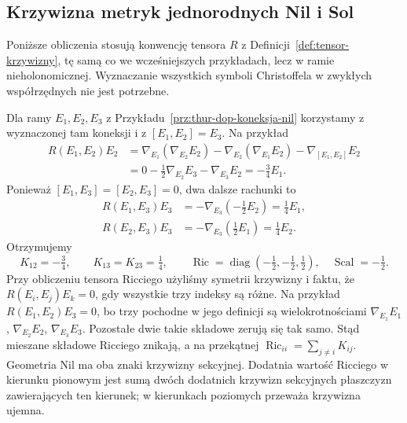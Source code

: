 \subsection*{Krzywizna metryk jednorodnych Nil i Sol}
\label{sec:thur-dop-krzywizna-nil-sol}
Poniższe obliczenia stosują konwencję tensora $R$ z
Definicji~\ref{def:tensor-krzywizny}, tę samą co we wcześniejszych
przykładach, lecz w ramie nieholonomicznej. Wyznaczanie
wszystkich symboli Christoffela w zwykłych współrzędnych
nie jest potrzebne.

\begin{przyklad}
\label{prz:thur-dop-krzywizna-nil}
Dla ramy $E_1,E_2,E_3$ z Przykładu~\ref{prz:thur-dop-koneksja-nil}
korzystamy z wyznaczonej tam koneksji i z $[E_1,E_2]=E_3$.
Na przykład
\[
\begin{aligned}
 R(E_1,E_2)E_2
 &=\nabla_{E_1}(\nabla_{E_2}E_2)
   -\nabla_{E_2}(\nabla_{E_1}E_2)
   -\nabla_{[E_1,E_2]}E_2\\
 &=0-\tfrac12\nabla_{E_2}E_3-\nabla_{E_3}E_2
 =-\tfrac34E_1.
\end{aligned}
\]
Ponieważ $[E_1,E_3]=[E_2,E_3]=0$, dwa dalsze rachunki to
\[
 \begin{aligned}
 R(E_1,E_3)E_3&=-\nabla_{E_3}(-\tfrac12E_2)=\tfrac14E_1,\\
 R(E_2,E_3)E_3&=-\nabla_{E_3}(\tfrac12E_1)=\tfrac14E_2.
 \end{aligned}
\]
Otrzymujemy
\[
 K_{12}=-\tfrac34,\qquad K_{13}=K_{23}=\tfrac14,
 \qquad \operatorname{Ric}
 =\operatorname{diag}(-\tfrac12,-\tfrac12,\tfrac12),
 \quad \operatorname{Scal}=-\tfrac12.
\]
Przy obliczeniu tensora Ricciego użyliśmy symetrii krzywizny i faktu,
że $R(E_i,E_j)E_k=0$, gdy wszystkie trzy indeksy są różne.
Na przykład $R(E_1,E_2)E_3=0$, bo trzy pochodne
w jego definicji są wielokrotnościami
$\nabla_{E_1}E_1$, $\nabla_{E_2}E_2$, $\nabla_{E_3}E_3$.
Pozostałe dwie takie składowe zerują się tak samo.
Stąd mieszane składowe Ricciego znikają, a na przekątnej
$\operatorname{Ric}_{ii}=\sum_{j\ne i}K_{ij}$.
Geometria Nil ma oba znaki krzywizny sekcyjnej. Dodatnia
wartość Ricciego w kierunku pionowym jest sumą dwóch
dodatnich krzywizn sekcyjnych płaszczyzn zawierających ten kierunek;
w kierunkach poziomych przeważa krzywizna ujemna.
\end{przyklad}

